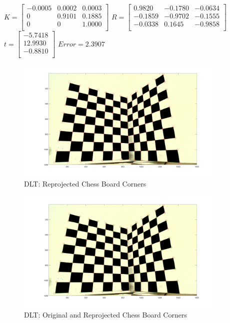 \documentclass[12pt]{article}
\begin{document}
$ K = \left[ \begin{array}{rrr}
-0.0005 &   0.0002 &   0.0003\\
0  &  0.9101  &  0.1885\\
0     &    0   & 1.0000\\
\end{array}\right] $
\vspace{5mm}
\newline
$ R = \left[ \begin{array}{rrr}
0.9820 &  -0.1780 &  -0.0634\\
-0.1859  & -0.9702 &  -0.1555\\
-0.0338 &   0.1645 &  -0.9858\\
\end{array}\right] $
\vspace{5mm}
\newline
$ t = \left[ \begin{array}{r}
-5.7418\\
12.9930\\
-0.8810\\
\end{array}\right] $
\vspace{5mm}
\newline
$Error =    2.3907$

\begin{figure}[ht]
	\centering
  \includegraphics[width=0.9\textwidth]{dlt_reprojected_points1.png}
	\caption{DLT: Reprojected Chess Board Corners}
	\label{fig1}
\end{figure}

\begin{figure}[ht]
	\centering
  \includegraphics[width=0.9\textwidth]{dlt_all_points1.png}
	\caption{DLT: Original and Reprojected Chess Board Corners}
	\label{fig1}
\end{figure}
\end{document}
